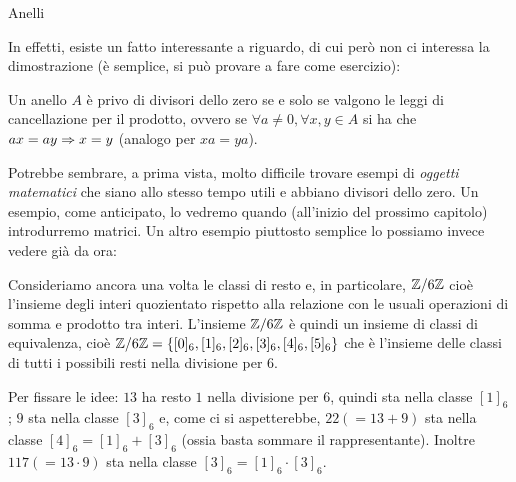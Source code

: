 \begin{subsubsection}{Anelli}
\begin{description}
			\end{description}
			In effetti, esiste un fatto interessante a riguardo, di cui però non ci interessa la dimostrazione (è semplice, si può provare a fare come esercizio):
			\begin{fatto}
				Un anello $A$ è privo di divisori dello zero se e solo se valgono le leggi di cancellazione per il prodotto, ovvero se $\forall a\neq0,\forall x,y\in A$ si ha che $ax = ay \Rightarrow x = y$ (analogo per $xa = ya$).
			\end{fatto}
			Potrebbe sembrare, a prima vista, molto difficile trovare esempi di \emph{oggetti matematici} che siano allo stesso tempo utili e abbiano divisori dello zero. Un esempio, come anticipato, lo vedremo quando (all'inizio del prossimo capitolo) introdurremo matrici. Un altro esempio piuttosto semplice lo possiamo invece vedere già da ora:
			\begin{eg}
				Consideriamo ancora una volta le classi di resto e, in particolare, $\mathbb{Z}/6\mathbb{Z}$ cioè l'insieme degli interi quozientato rispetto alla relazione  con le usuali operazioni di somma e prodotto tra interi.
				L'insieme $\mathbb{Z}/6\mathbb{Z}$ è quindi un insieme di classi di equivalenza, cioè $\mathbb{Z}/6\mathbb{Z}=\{[0]_6,[1]_6,[2]_6,[3]_6,[4]_6,[5]_6\}$ che è l'insieme delle classi di tutti i possibili resti nella divisione per $6$. 
				
				Per fissare le idee: $13$ ha resto $1$ nella divisione per $6$, quindi sta nella classe $[1]_6$; $9$ sta nella classe $[3]_6$ e, come ci si aspetterebbe, $22(=13+9)$ sta nella classe $[4]_6=[1]_6+[3]_6$ (ossia basta sommare il rappresentante). Inoltre $117(=13\cdot9)$ sta nella classe $[3]_6=[1]_6\cdot[3]_6$.
				

\end{eg}
\end{subsubsection}

